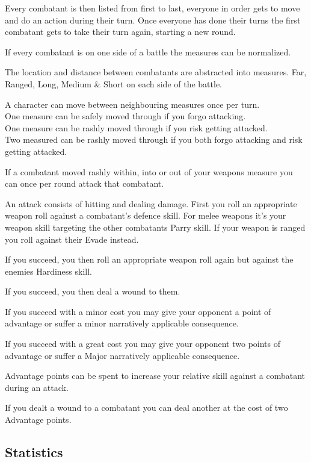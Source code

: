 Every combatant is then listed from first to last, everyone in order gets to move and do an action during their turn.
Once everyone has done their turns the first combatant gets to take their turn again, starting a new round.

If every combatant is on one side of a battle the measures can be normalized.

The location and distance between combatants are abstracted into measures. 
Far, Ranged, Long, Medium \& Short on each side of the battle.

A character can move between neighbouring measures once per turn. \\
One measure can be safely moved through if you forgo attacking.\\ %
One measure can be rashly moved through if you risk getting attacked.\\ %
Two measured can be rashly moved through if you both forgo attacking and risk getting attacked. %

If a combatant moved rashly within, into or out of your weapons measure you can once per round attack that combatant.


An attack consists of hitting and dealing damage. 
First you roll an appropriate weapon roll against a combatant's defence skill. For melee weapons it's your weapon skill targeting the other combatants Parry skill.
If your weapon is ranged you roll against their Evade instead.

If you succeed, you then roll an appropriate weapon roll again but against the enemies Hardiness skill. 

If you succeed, you then deal a wound to them. 

If you succeed with a minor cost you may give your opponent a point of advantage or suffer a minor narratively applicable consequence.

If you succeed with a great cost you may give your opponent two points of advantage or suffer a Major narratively applicable consequence.

Advantage points can be spent to increase your relative skill against a combatant during an attack.

If you dealt a wound to a combatant you can deal another at the cost of two Advantage points.

\subsection{Statistics}

